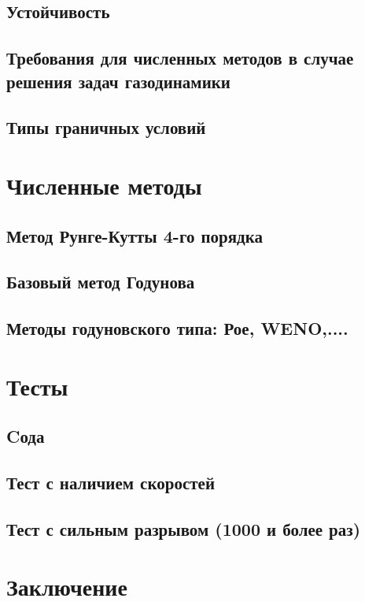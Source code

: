 \documentclass[a4paper,12pt]{extarticle}
\begin{document}
\subsection{Устойчивость}
\subsection{Требования для численных методов в случае решения задач газодинамики}
\subsection{Типы граничных условий}

\section{Численные методы}
\subsection{Метод Рунге-Кутты 4-го порядка}
\subsection{Базовый метод Годунова}
\subsection{Методы годуновского типа: Рое, WENO,....}

\section{Тесты}
\subsection{Cода}
\subsection{Тест с наличием скоростей}
\subsection{Тест с сильным разрывом (1000 и более раз)}

\section{Заключение}

\clearpage
\printbibliography
\end{document}
